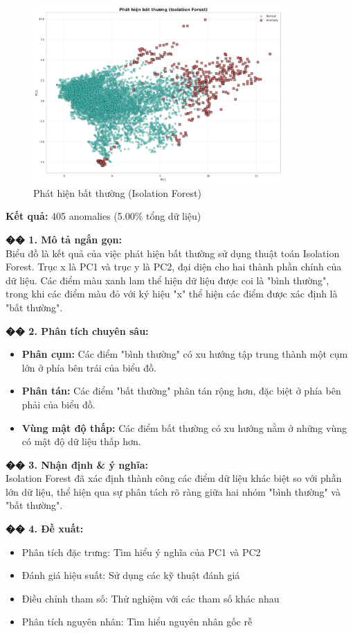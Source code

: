 \documentclass[12pt,a4paper]{article}
\begin{document}
\begin{figure}[H]
\centering
\includegraphics[width=0.85\textwidth]{results_comb_PM25_Hanoi_2018_sm_20251011_121424/20251011_121424_ml_anomaly_detection.png}
\caption{Phát hiện bất thường (Isolation Forest)}
\end{figure}

\begin{aibox}
\textbf{Kết quả:} 405 anomalies (5.00\% tổng dữ liệu)

\textbf{�� 1. Mô tả ngắn gọn:}\\
Biểu đồ là kết quả của việc phát hiện bất thường sử dụng thuật toán Isolation Forest. Trục x là PC1 và trục y là PC2, đại diện cho hai thành phần chính của dữ liệu. Các điểm màu xanh lam thể hiện dữ liệu được coi là "bình thường", trong khi các điểm màu đỏ với ký hiệu "x" thể hiện các điểm được xác định là "bất thường".

\textbf{�� 2. Phân tích chuyên sâu:}
\begin{itemize}
    \item \textbf{Phân cụm:} Các điểm "bình thường" có xu hướng tập trung thành một cụm lớn ở phía bên trái của biểu đồ.
    \item \textbf{Phân tán:} Các điểm "bất thường" phân tán rộng hơn, đặc biệt ở phía bên phải của biểu đồ.
    \item \textbf{Vùng mật độ thấp:} Các điểm bất thường có xu hướng nằm ở những vùng có mật độ dữ liệu thấp hơn.
\end{itemize}

\textbf{�� 3. Nhận định \& ý nghĩa:}\\
Isolation Forest đã xác định thành công các điểm dữ liệu khác biệt so với phần lớn dữ liệu, thể hiện qua sự phân tách rõ ràng giữa hai nhóm "bình thường" và "bất thường".

\textbf{�� 4. Đề xuất:}
\begin{itemize}
    \item Phân tích đặc trưng: Tìm hiểu ý nghĩa của PC1 và PC2
    \item Đánh giá hiệu suất: Sử dụng các kỹ thuật đánh giá
    \item Điều chỉnh tham số: Thử nghiệm với các tham số khác nhau
    \item Phân tích nguyên nhân: Tìm hiểu nguyên nhân gốc rễ
\end{itemize}
\end{aibox}
\end{document}
